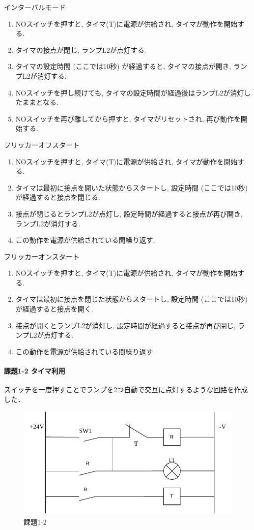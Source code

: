 インターバルモード
\begin{enumerate}
  \item NOスイッチを押すと, タイマ(T)に電源が供給され, タイマが動作を開始する.
  \item タイマの接点が閉じ, ランプL2が点灯する.
  \item タイマの設定時間 (ここでは10秒) が経過すると, タイマの接点が開き, ランプL2が消灯する.
  \item NOスイッチを押し続けても, タイマの設定時間が経過後はランプL2が消灯したままとなる.
  \item NOスイッチを再び離してから押すと, タイマがリセットされ, 再び動作を開始する.
\end{enumerate}

フリッカーオフスタート
\begin{enumerate}
  \item NOスイッチを押すと, タイマ(T)に電源が供給され, タイマが動作を開始する.
  \item タイマは最初に接点を開いた状態からスタートし, 設定時間 (ここでは10秒) が経過すると接点を閉じる.
  \item 接点が閉じるとランプL2が点灯し, 設定時間が経過すると接点が再び開き, ランプL2が消灯する.
  \item この動作を電源が供給されている間繰り返す.
\end{enumerate}

フリッカーオンスタート
\begin{enumerate}
  \item NOスイッチを押すと, タイマ(T)に電源が供給され, タイマが動作を開始する.
  \item タイマは最初に接点を閉じた状態からスタートし, 設定時間 (ここでは10秒) が経過すると接点を開く.
  \item 接点が開くとランプL2が消灯し, 設定時間が経過すると接点が再び閉じ, ランプL2が点灯する.
  \item この動作を電源が供給されている間繰り返す.
\end{enumerate}


\paragraph{課題1-2 タイマ利用}
スイッチを一度押すことでランプを2つ自動で交互に点灯するような回路を作成した．
\begin{figure}[H]
  \centering
  \includegraphics[scale=0.5]{sozai/15.pdf}
  \caption{課題1-2}
\end{figure}


